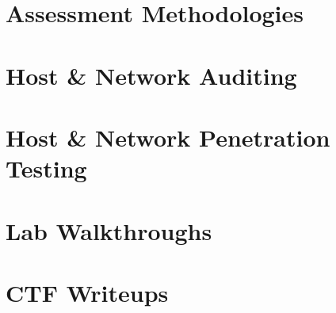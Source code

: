 \documentclass[11pt,a4paper,openany]{book}
\begin{document}
\part{Assessment Methodologies}





\part{Host \& Network Auditing}


\part{Host \& Network Penetration Testing}





\part{Lab Walkthroughs}




\part{CTF Writeups}




\end{document}
